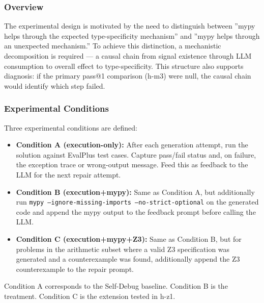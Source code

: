 
\subsubsection{Overview}

The experimental design is motivated by the need to distinguish between ''mypy helps through the expected type-specificity mechanism'' and ''mypy helps through an unexpected mechanism.'' To achieve this distinction, a mechanistic decomposition is required --- a causal chain from signal existence through LLM consumption to overall effect to type-specificity. This structure also supports diagnosis: if the primary pass@1 comparison (h-m3) were null, the causal chain would identify which step failed.

\subsubsection{Experimental Conditions}

Three experimental conditions are defined:

\begin{itemize}
\item \textbf{Condition A (execution-only):} After each generation attempt, run the solution against EvalPlus test cases. Capture pass/fail status and, on failure, the exception trace or wrong-output message. Feed this as feedback to the LLM for the next repair attempt.
\end{itemize}

\begin{itemize}
\item \textbf{Condition B (execution+mypy):} Same as Condition A, but additionally run \texttt{mypy --ignore-missing-imports --no-strict-optional} on the generated code and append the mypy output to the feedback prompt before calling the LLM.
\end{itemize}

\begin{itemize}
\item \textbf{Condition C (execution+mypy+Z3):} Same as Condition B, but for problems in the arithmetic subset where a valid Z3 specification was generated and a counterexample was found, additionally append the Z3 counterexample to the repair prompt.
\end{itemize}

Condition A corresponds to the Self-Debug baseline. Condition B is the treatment. Condition C is the extension tested in h-z1.

